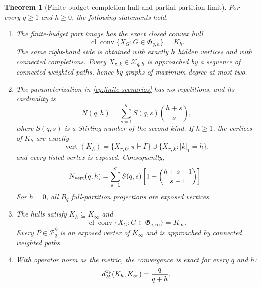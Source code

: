 \documentclass[journal,10pt]{IEEEtran}
\newtheorem{theorem}{Theorem}
\theoremstyle{definition}
\theoremstyle{remark}
\newcommand{\conv}{\operatorname{conv}}
\newcommand{\cl}{\operatorname{cl}}
\newcommand{\cX}{\mathcal X}
\newcommand{\cP}{\mathcal P}
\newcommand{\fG}{\mathfrak G}
\begin{document}
\begin{theorem}[Finite-budget completion hull and partial-partition limit]
\label{thm:main}
For every $q\geq1$ and $h\geq0$, the following statements hold.

\begin{enumerate}[label=\textup{(\roman*)},leftmargin=2.1em]
\item The finite-budget port image has the exact closed convex hull
\begin{equation}
  \cl\conv\{X_G:G\in\fG_{q,h}\}=K_h.
  \label{eq:finite-hull}
\end{equation}
The same right-hand side is obtained with exactly $h$ hidden vertices and
with connected completions.  Every $X_{\pi,k}\in\cX_{q,h}$ is approached by
a sequence of connected weighted paths, hence by graphs of maximum degree at
most two.

\item The parameterization in \eqref{eq:finite-scenarios} has no repetitions,
and its cardinality is
\begin{equation}
  N(q,h)=\sum_{s=1}^q S(q,s)\binom{h+s}{s},
  \label{eq:candidate-count}
\end{equation}
where $S(q,s)$ is a Stirling number of the second kind.  If $h\geq1$, the
vertices of $K_h$ are exactly
\begin{equation}
  \operatorname{vert}(K_h)
  =\{X_{\pi,0}:\pi\vdash\Gamma\}
   \cup
   \{X_{\pi,k}:|k|_1=h\},
  \label{eq:finite-vertices}
\end{equation}
and every listed vertex is exposed.  Consequently,
\begin{equation}
  N_{\rm vert}(q,h)
  =\sum_{s=1}^q S(q,s)
       \left[1+\binom{h+s-1}{s-1}\right].
  \label{eq:vertex-count}
\end{equation}
For $h=0$, all $B_q$ full-partition projections are exposed vertices.

\item The hulls satisfy $K_h\subseteq K_\infty$ and
\begin{equation}
  \cl\conv\{X_G:G\in\fG_{q,\infty}\}=K_\infty.
  \label{eq:unbounded-hull}
\end{equation}
Every $P\in\cP_q^\partial$ is an exposed vertex of $K_\infty$ and is
approached by connected weighted paths.

\item With operator norm as the metric, the convergence is exact for every
$q$ and $h$:
\begin{equation}
  d_H^{\rm op}(K_h,K_\infty)=\frac{q}{q+h}.
  \label{eq:hausdorff}
\end{equation}
\end{enumerate}
\end{theorem}
\end{document}
